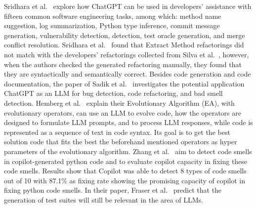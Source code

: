 Sridhara et al.~\cite{sridhara2023chatgpt} explore how ChatGPT can be used in developers' assistance with fifteen common software engineering tasks, among which: method name suggestion, log summarization, Python type inference, commit message generation, vulnerability detection, detection, test oracle generation, and merge conflict resolution. Sridhara et al.~\cite{sridhara2023chatgpt} found that Extract Method refactorings did not match with the developers' refactorings collected from Silva et al.~\cite{10.1145/2950290.2950305}, however, when the authors checked the generated refactoring manually, they found that they are syntactically and semantically correct.
Besides code generation and code documentation, the paper of Sadik et al.~\cite{sadik2023analysis} investigates the potential application ChatGPT as an LLM for bug detection, code refactoring, and bad smell detection.
  Hemberg et al.~\cite{hemberg2024evolving} explain their Evolutionary Algorithm (EA), with evolutionary operators, can use an LLM to evolve code, how the operators are designed to formulate LLM prompts, and to process LLM responses, while code is represented as a sequence of text in code syntax. Its goal is to get the best solution code that fits the best the beforehand mentioned operators as hyper parameters of the evolutionary algorithm. Zhang et al.~\cite{zhang2024copilot} aim to detect code smells in  copilot-generated python code and to evaluate copilot capacity in fixing these code smells. Results show that Copilot was able to detect 8 types of code smells out of 10 with 87.1\% as fixing rate showing the promising capacity of copilot in fixing python code smells. In their paper, Fraser et al.~\cite{10876166} predict that the generation of test suites will still be relevant in the area of LLMs.
  
